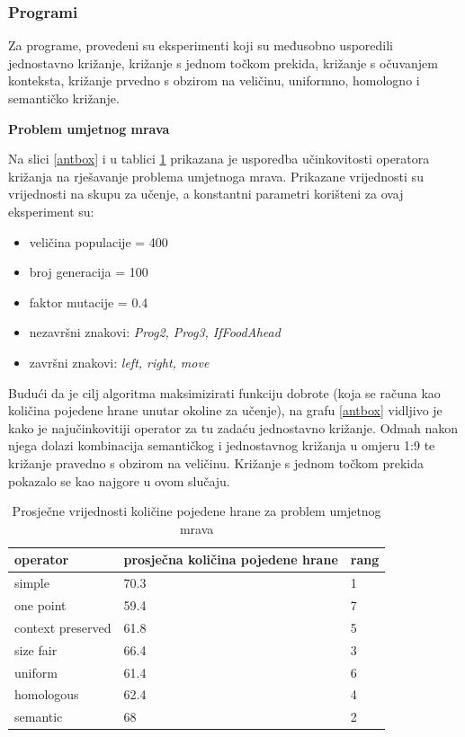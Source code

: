 \subsubsection{Programi}

Za programe, provedeni su eksperimenti koji su međusobno usporedili jednostavno križanje, križanje s jednom točkom prekida, križanje s očuvanjem konteksta, križanje prvedno s obzirom na veličinu, uniformno, homologno i semantičko križanje.

\textbf{Problem umjetnog mrava}

Na slici \ref{antbox} i u tablici \ref{anttable} prikazana je usporedba učinkovitosti operatora križanja na rješavanje problema umjetnoga mrava. Prikazane vrijednosti su vrijednosti na skupu za učenje, a konstantni parametri korišteni za ovaj eksperiment su:
\begin{itemize}
\item{veličina populacije = 400}
\item{broj generacija = 100}
\item{faktor mutacije = 0.4}
\item{nezavršni znakovi: \textit{Prog2, Prog3, IfFoodAhead}}
\item{završni znakovi: \textit{left, right, move}}
\end{itemize} 

Budući da je cilj algoritma maksimizirati funkciju dobrote (koja se računa kao količina pojedene hrane unutar okoline za učenje), na grafu \ref{antbox} vidljivo je kako je najučinkovitiji operator za tu zadaću jednostavno križanje. Odmah nakon njega dolazi kombinacija semantičkog i jednostavnog križanja u omjeru 1:9 te križanje pravedno s obzirom na veličinu. Križanje s jednom točkom prekida pokazalo se kao najgore u ovom slučaju.

\begin{table}[H]
 	\centering
    \caption{Prosječne vrijednosti količine pojedene hrane za problem umjetnog mrava}
    \begin{tabular}{| l | l | l |}
    \hline
    \textbf{operator} & \textbf{prosječna količina pojedene hrane} & \textbf{rang}\\ \hline
    simple & 70.3 & 1\\ \hline
    one point & 59.4 & 7\\ \hline
    context preserved & 61.8 & 5\\ \hline
    size fair & 66.4 & 3\\ \hline
    uniform & 61.4 & 6\\ \hline
    homologous & 62.4 & 4\\ \hline
    semantic & 68 & 2\\ \hline
    \end{tabular}
    

    \label{anttable}
\end{table}

